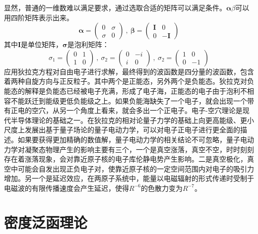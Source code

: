 显然，普通的一维数难以满足要求，通过选取合适的矩阵可以满足条件。$\bm{\alpha}\beta$可以用四阶矩阵表示出来。
\begin{equation}
    \bm{\alpha}= \begin{pmatrix}
        0 & \sigma \\
        \sigma & 0
    \end{pmatrix}
    \ , \ \bm{\beta} = 
    \begin{pmatrix}
        \bm{I} & 0\\
        0& \bm{-I}
    \end{pmatrix}
    \label{eq:pl1}
\end{equation}
其中$\bm{I}$是单位矩阵，$\bm{\sigma}$是泡利矩阵：
\begin{equation}
    \sigma _{1} =
    \begin{pmatrix}
        0 & 1 \\
        1 & 0
    \end{pmatrix}
    \ , \ 
    \sigma _{2} = 
    \begin{pmatrix}
        0 & -i \\
        i & 0
    \end{pmatrix}
    \ , \ 
    \sigma _{2} = 
    \begin{pmatrix}
        1 & 0 \\
        0 & -1
    \end{pmatrix}
    \label{eq:pl2}
\end{equation}
应用狄拉克方程对自由电子进行求解，最终得到的波函数是四分量的波函数，包含着两种自旋方向与正反粒子。其中两个是正能态，另外两个是负能态。狄拉克对负能态的解释是负能态已经被电子充满，形成了电子海，正能态的电子由于泡利不相容不能跃迁到能级更低负能级之上。如果负能海缺失了一个电子，就会出现一个带有正电的空穴，从另一个角度上看来，就会多出一个正电子。电子-空穴理论是现代半导体理论的基础之一。在狄拉克的相对论量子力学的基础上向更高能级、更小尺度上发展出基于量子场论的量子电动力学，可以对电子正电子进行更全面的描述。如果要获得更加精确的数值解，量子电动力学的相关结论不可忽略，量子电动力学对凝聚态物理产生的影响主要有三个，一个是真空涨落，真空不空，时时刻刻存在着涨落现象，会对靠近原子核的电子库伦静电势产生影响。二是真空极化，真空中可能会自发出现正负电子对，使靠近原子核的一定空间范围内对电子的吸引力增加。另一个是延迟效应，在两原子系统中，能量以电磁辐射的形式传递时受制于电磁波的有限传播速度会产生延迟，使得$R^{-6}$的色散力变为$R^{-7}$。





\section{密度泛函理论}

